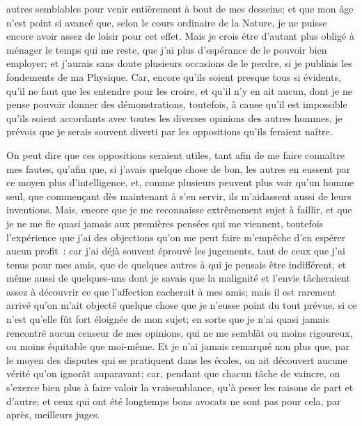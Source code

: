 \documentclass[french,twoside]{book} %
\begin{document}
autres semblables pour venir entièrement à bout de mes desseins; et que mon âge n'est point si avancé que, selon le cours ordinaire de la Nature, je ne puisse encore avoir assez de loisir pour cet effet. Mais je crois être d'autant plus obligé à ménager le temps qui me reste, que j'ai plus d'espérance de le pouvoir bien employer; et j'aurais sans doute plusieurs occasions de le perdre, si je publiais les fondements de ma Physique. Car, encore qu'ils soient presque tous si évidents, qu'il ne faut que les entendre pour les croire, et qu'il n'y en ait aucun, dont je ne pense pouvoir donner des démonstrations, toutefois, à cause qu'il est impossible qu'ils soient accordants avec toutes les diverses opinions des autres hommes, je prévois que je serais souvent diverti par les oppositions qu'ils feraient naître.\par
On peut dire que ces oppositions seraient utiles, tant afin de me faire connaître mes fautes, qu'afin que, si j'avais quelque chose de bon, les autres en eussent par ce moyen plus d'intelligence, et, comme plusieurs peuvent plus voir qu'un homme seul, que commençant dès maintenant à s'en servir, ils m'aidassent aussi de leurs inventions. Mais, encore que je me reconnaisse extrêmement sujet à faillir, et que je ne me fie quasi jamais aux premières pensées qui me viennent, toutefois l'expérience que j'ai des objections qu'on me peut faire m'empêche d'en espérer aucun profit : car j'ai déjà souvent éprouvé les jugements, tant de ceux que j'ai tenus pour mes amis, que de quelques autres à qui je pensais être indifférent, et même aussi de quelques-uns dont je savais que la malignité et l'envie tâcheraient assez à découvrir ce que l'affection cacherait à mes amis; mais il est rarement arrivé qu'on m'ait objecté quelque chose que je n'eusse point du tout prévue, si ce n'est qu'elle fût fort éloignée de mon sujet; en sorte que je n'ai quasi jamais rencontré aucun censeur de mes opinions, qui ne me semblât ou moins rigoureux, ou moins équitable que moi-même. Et je n'ai jamais remarqué non plus que, par le moyen des disputes qui se pratiquent dans les écoles, on ait découvert aucune vérité qu'on ignorât auparavant; car, pendant que chacun tâche de vaincre, on s'exerce bien plus à faire valoir la vraisemblance, qu'à peser les raisons de part et d'autre; et ceux qui ont été longtemps bons avocats ne sont pas pour cela, par après, meilleurs juges.\par
\end{document}
